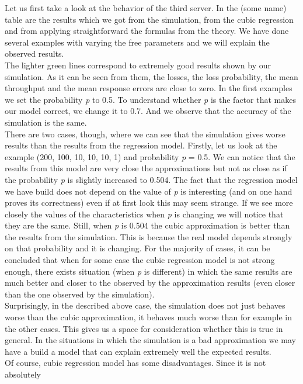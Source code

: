 \documentclass[12pt]{article}
\theoremstyle{plain}
\begin{document}
Let us first take a look at the behavior of the third server. In the (some name)
table are the results which we got from the simulation, from the cubic regression and
from applying straightforward the formulas from the theory. We have done several examples
with varying the free parameters and we will explain the observed results.\\
The lighter green lines correspond to extremely good results shown by our simulation. As it
can be seen from them, the losses, the loss probability, the mean throughput and
the mean response errors are close to zero. In the first examples we set the probability
\emph{p} to 0.5. To understand whether \emph{p} is the factor that makes our model
correct, we change it to 0.7. And we observe that the accuracy of the simulation
is the same.\\
There are two cases, though, where we can see that the simulation gives worse results
than the results from the regression model. Firstly, let us look at the example
(200, 100, 10, 10, 10, 1) and probability \emph{p} = 0.5. We can notice that the
results from this model are very close the approximations but not as close as if
the probability \emph{p} is slightly increased to 0.504. The fact that the
regression model we have build does not depend on the value of \emph{p} is
interesting (and on one hand proves its correctness) even if at first look this
may seem strange. If we see more closely the values of the characteristics when
\emph{p} is changing we will notice that they are the same. Still, when \emph{p}
is 0.504 the cubic approximation is better than the results from the simulation.
This is because the real model depends strongly on that probability and it is
changing. For the majority of cases, it can be concluded that when for some case
the cubic regression model is not strong enough, there exists situation (when
\emph{p} is different) in which the same results are much better and closer to
the observed by the approximation results (even closer than the one observed by
the simulation).\\
Surprisingly, in the described above case, the simulation does not just behaves
worse than the cubic approximation, it behaves much worse than for example in
the other cases. This gives us a space for consideration whether this is true in
general. In the situations in which the simulation is a bad approximation we
may have a build a model that can explain extremely well the expected results.\\
Of course, cubic regression model has some disadvantages. Since it is not absolutely
\end{document}
